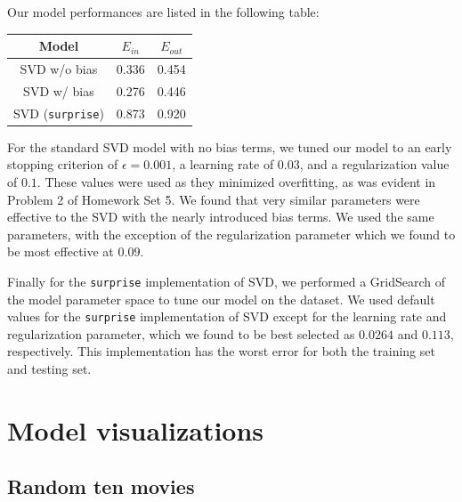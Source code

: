 Our model performances are listed in the following table:
\begin{center}
    \begin{tabular}{|c|c|c|}
        \hline
        Model & $E_{in}$ & $E_{out}$ \\ 
        \hline
        SVD w/o bias & 0.336 & 0.454 \\
        \hline
        SVD w/ bias & 0.276 & 0.446 \\ 
        \hline
        SVD (\texttt{surprise}) & 0.873 & 0.920 \\
        \hline
    \end{tabular}
\end{center}

For the standard SVD model with no bias terms, we tuned our model to an early stopping criterion of $\epsilon = 0.001$, a learning rate of $0.03$, 
and a regularization value of $0.1$. These values were used as they minimized overfitting, as was evident in Problem 2 of Homework Set 5. We found 
that very similar parameters were effective to the SVD with the nearly introduced bias terms. We used the same parameters, with the exception of 
the regularization parameter which we found to be most effective at $0.09$.
\par 
Finally for the \texttt{surprise} implementation of SVD, we performed a GridSearch of the model parameter space to tune our model on the
dataset. We used default values for the \texttt{surprise} implementation of SVD except for the learning rate and regularization parameter, which 
we found to be best selected as $0.0264$ and $0.113$, respectively. This implementation has the worst error for both the training set and testing 
set.

\section{Model visualizations}

\subsection{Random ten movies}

